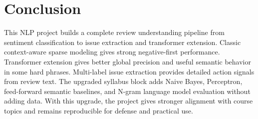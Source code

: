 \documentclass[12pt,a4paper]{article}
\begin{document}
\section{Conclusion}
This NLP project builds a complete review understanding pipeline from sentiment classification to issue extraction and transformer extension. Classic context-aware sparse modeling gives strong negative-first performance. Transformer extension gives better global precision and useful semantic behavior in some hard phrases. Multi-label issue extraction provides detailed action signals from review text. The upgraded syllabus block adds Naive Bayes, Perceptron, feed-forward semantic baselines, and N-gram language model evaluation without adding data. With this upgrade, the project gives stronger alignment with course topics and remains reproducible for defense and practical use.

\clearpage
\end{document}
